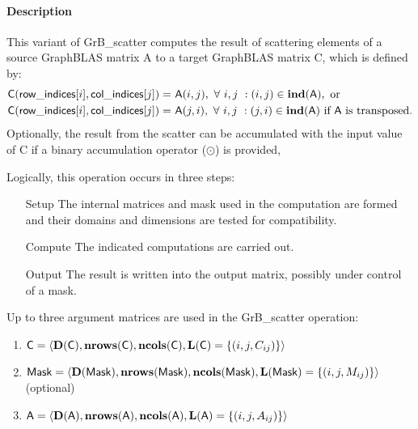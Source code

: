\paragraph{Description}

This variant of {\sf GrB\_scatter} computes the result of scattering elements 
of a source GraphBLAS matrix {\sf A} to a target GraphBLAS matrix {\sf C},
which is defined by:
\[
\begin{aligned}
  	{\sf C}({\sf row\_indices}[i],{\sf col\_indices}[j]) = &\ {\sf A}(i,j), 
	\ \forall \ i,j \ : (i,j) \in \bold{ind}({\sf A}),\ \mbox{or} \\
  	{\sf C}({\sf row\_indices}[i],{\sf col\_indices}[j]) = &\ {\sf A}(j,i), 
	\ \forall \ i,j \ : (j,i) \in \bold{ind}({\sf A})\ \mbox{if {\sf A} is transposed}. \\
\end{aligned}
\]  
Optionally, the result from the scatter can be accumulated
with the input value of {\sf C} if a
binary accumulation operator ($\odot$) is provided, 

Logically, this operation occurs in three steps:
\begin{enumerate}[leftmargin=0.75in]
\item[Setup] The internal matrices and mask used in the computation are formed 
and their domains and dimensions are tested for compatibility.
\item[Compute] The indicated computations are carried out.
\item[Output] The result is written into the output matrix, possibly under 
control of a mask.
\end{enumerate}

Up to three argument matrices are used in the {\sf GrB\_scatter} operation:
\begin{enumerate}
	\item ${\sf C} = \langle \bold{D}({\sf C}),\bold{nrows}({\sf C}),
    \bold{ncols}({\sf C}),\bold{L}({\sf C}) = \{(i,j,C_{ij}) \} \rangle$
    
	\item ${\sf Mask} = \langle \bold{D}({\sf Mask}),\bold{nrows}({\sf Mask}),
    \bold{ncols}({\sf Mask}),\bold{L}({\sf Mask}) = \{(i,j,M_{ij}) \} \rangle$ (optional)
    
	\item ${\sf A} = \langle \bold{D}({\sf A}),\bold{nrows}({\sf A}), 
    \bold{ncols}({\sf A}),\bold{L}({\sf A}) = \{(i,j,A_{ij}) \} \rangle$
\end{enumerate}

